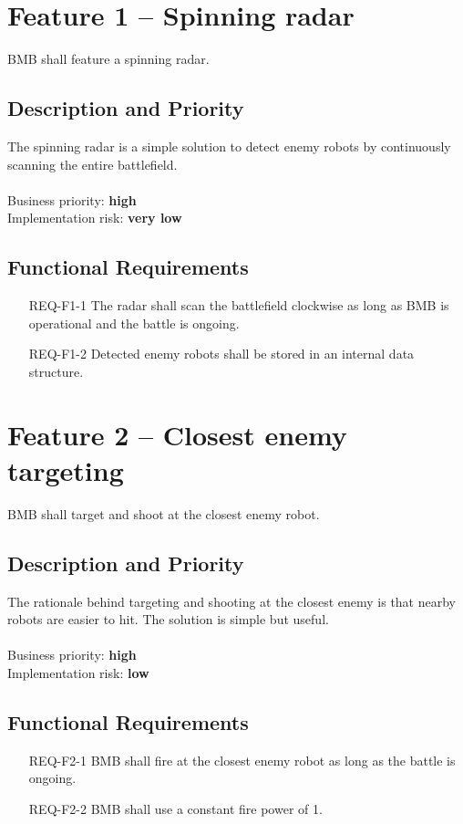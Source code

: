 \documentclass{scrreprt}
\begin{document}
\section{Feature 1 -- Spinning radar}
BMB shall feature a spinning radar.

\subsection{Description and Priority}
The spinning radar is a simple solution to detect enemy robots by continuously scanning the entire battlefield.\\\\Business priority: \textbf{high}\\
Implementation risk: \textbf{very low}

\subsection{Functional Requirements}
\begin{itemize}
\item[REQ-F1-1] The radar shall scan the battlefield clockwise as long as BMB is operational and the battle is ongoing.
\item[REQ-F1-2] Detected enemy robots shall be stored in an internal data structure. 
\end{itemize}

\section{Feature 2 -- Closest enemy targeting}
BMB shall target and shoot at the closest enemy robot.

\subsection{Description and Priority}
The rationale behind targeting and shooting at the closest enemy is that nearby robots are easier to hit. The solution is simple but useful.\\\\Business priority: \textbf{high}\\
Implementation risk: \textbf{low}

\subsection{Functional Requirements}
\begin{itemize}
\item[REQ-F2-1] BMB shall fire at the closest enemy robot as long as the battle is ongoing.
\item[REQ-F2-2] BMB shall use a constant fire power of 1.
\end{itemize}
\end{document}
